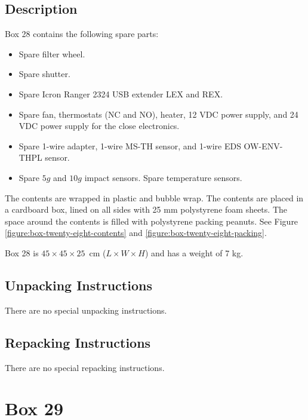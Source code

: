 \documentclass{article}
\begin{document}
\subsection{Description}

Box 28 contains the following spare parts:

\begin{itemize}
    \item Spare filter wheel.
    \item Spare shutter.
    \item Spare Icron Ranger 2324 USB extender LEX and REX.
    \item Spare fan, thermostats (NC and NO), heater, 12 VDC power supply, and 24 VDC power supply for the close electronics.
    \item Spare 1-wire adapter, 1-wire MS-TH sensor, and 1-wire EDS OW-ENV-THPL sensor.
    \item Spare $5g$ and $10g$ impact sensors. Spare temperature sensors.
\end{itemize}

The contents are wrapped in plastic and bubble wrap. The contents are placed in a cardboard box, lined on all sides with 25 mm polystyrene foam sheets. The space around the contents is filled with polystyrene packing peanuts. See Figure \ref{figure:box-twenty-eight-contents} and \ref{figure:box-twenty-eight-packing}.

Box 28 is  $45 \times 45 \times 25$~cm ($L \times W \times H$) and has a weight of 7 kg.

\subsection{Unpacking Instructions}

There are no special unpacking instructions.

\subsection{Repacking Instructions}

There are no special repacking instructions.


\clearpage
\section{Box 29}
\end{document}
